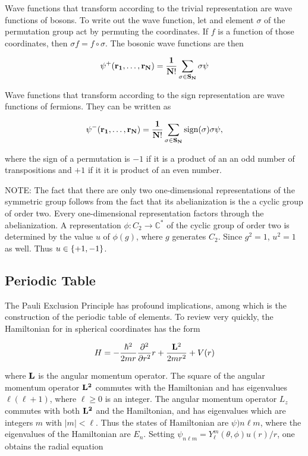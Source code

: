 Wave functions that transform according to the trivial representation are wave functions of bosons.  To write out the wave function, let and element $\sigma$ of the permutation group act by permuting the coordinates.  If $f$ is a function of those coordinates, then $\sigma f = f\circ \sigma$.  The bosonic wave functions are then

\begin{equation}
 \psi^+(\bf{r}_1, \ldots , \bf{r}_N) 
=
\frac{1}{N!} \sum_{\sigma \in S_N} \sigma \psi
\end{equation}

Wave functions that transform according to the sign representation are wave functions of fermions.  They can be written as

\begin{equation}
 \psi^-(\bf{r}_1, \ldots , \bf{r}_N) 
=
\frac{1}{N!} \sum_{\sigma \in S_N} \text{sign}(\sigma)\sigma \psi,
\end{equation}

where the sign of a permutation is $-1$ if it is a product of an an odd number of transpositions and $+1$ if it it is product of an even number.


NOTE: The fact that there are only two one-dimensional representations of the symmetric group follows from the fact that its abelianization is the  a cyclic group of order two.  Every one-dimensional representation factors through the abelianization.  A representation $\phi: C_2 \longrightarrow \mathbb{C}^*$ of the cyclic group of order two is determined by the value  $u$ of $\phi(g)$, where $g$ generates $C_2$.  Since $g^2 = 1$, 
$u^2 = 1$ as well.  Thus $u \in \{ +1, -1\}$.





\subsection{Periodic Table}

The Pauli Exclusion Principle has profound implications, among which is the construction of the periodic table of elements.   To review very quickly, the Hamiltonian for in spherical coordinates has the form 

\begin{equation}
H = - \frac{ \hbar^2 }{2mr}\frac{ \partial^2 }{ \partial r^2 } r + \frac{{\bf L}^2}{ 2mr^ 2 }  + V(r)
\end{equation}

where $\bf{L}$ is the angular momentum operator.  The square of the angular momentum operator $\bf{L}^2$ commutes with the Hamiltonian and has eigenvalues $\ell(\ell + 1)$, where $\ell \ge 0$ is an integer.  The angular momentum operator $L_z$ commutes with both $\bf{L}^2$ and the Hamiltonian, and has eigenvalues which are integers $m$ with $|m| < \ell$. Thus the states of Hamiltonian are $\psi){n\ell m}$, where the eigenvalues of the Hamiltonian are $E_n$. Setting $\psi_{n\ell m}  = Y^m_\ell(\theta, \phi)u(r)/r$, one obtains the radial equation

